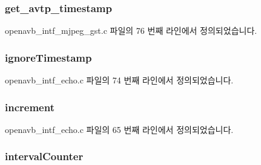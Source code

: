 \subsubsection[{\texorpdfstring{get\+\_\+avtp\+\_\+timestamp}{get_avtp_timestamp}}]{ get\+\_\+avtp\+\_\+timestamp}\hypertarget{structpvt__data__t_ae0d64a11bd4a819ee73a35df3c401427}{}\label{structpvt__data__t_ae0d64a11bd4a819ee73a35df3c401427}


openavb\+\_\+intf\+\_\+mjpeg\+\_\+gst.\+c 파일의 76 번째 라인에서 정의되었습니다.

\subsubsection[{\texorpdfstring{ignore\+Timestamp}{ignoreTimestamp}}]{ ignore\+Timestamp}\hypertarget{structpvt__data__t_a2a0aac103e25975d0ba22350a71e70ae}{}\label{structpvt__data__t_a2a0aac103e25975d0ba22350a71e70ae}


openavb\+\_\+intf\+\_\+echo.\+c 파일의 74 번째 라인에서 정의되었습니다.

\subsubsection[{\texorpdfstring{increment}{increment}}]{ increment}\hypertarget{structpvt__data__t_a5223c7d30b0f3f2010bed286d2ff8181}{}\label{structpvt__data__t_a5223c7d30b0f3f2010bed286d2ff8181}


openavb\+\_\+intf\+\_\+echo.\+c 파일의 65 번째 라인에서 정의되었습니다.

\subsubsection[{\texorpdfstring{interval\+Counter}{intervalCounter}}]{ interval\+Counter}\hypertarget{structpvt__data__t_a21c6933b90f224d67ff83bf224c7d313}{}\label{structpvt__data__t_a21c6933b90f224d67ff83bf224c7d313}


